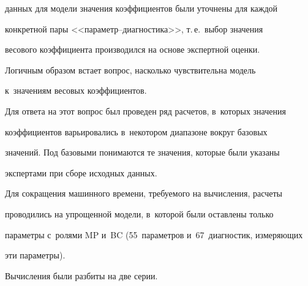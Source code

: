 данных для модели значения коэффициентов были уточ\-не\-ны для каж\-дой 


конкретной пары <<па\-ра\-метр--диаг\-но\-сти\-ка>>, т.\,е.\ выбор значения 


весового коэффициента производился на основе экспертной оценки. 


Логичным образом встает вопрос, насколько чувствительна модель 


к~значениям весовых коэффициентов. 





Для ответа на этот вопрос был проведен ряд расчетов, в~которых значения 


коэффициентов варьировались в~некотором диапазоне вокруг базовых 


значений. Под базовыми понимаются те значения, которые были указаны 


экспертами при сборе исходных данных. 





Для сокращения машинного времени, тре\-бу\-емо\-го на вы\-чис\-ле\-ния, расчеты 


проводились на упрощенной модели, в~которой были оставлены только 


па\-ра\-мет\-ры с~ролями MP и~BC (55~параметров и~67~диагностик, измеряющих 


эти па\-ра\-мет\-ры).





Вычисления были разбиты на две серии. 


